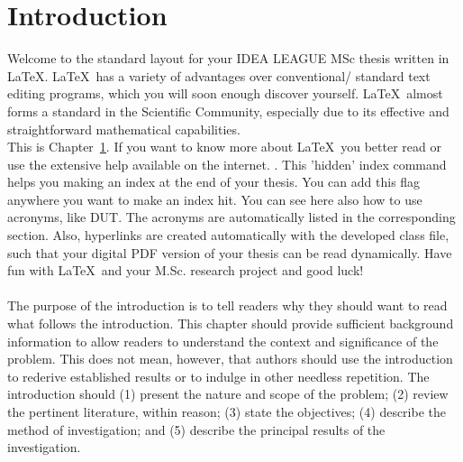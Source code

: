 \chapter{Introduction} \label{chap::intro}

    Welcome to the standard layout for your IDEA LEAGUE MSc thesis written in \LaTeX. \LaTeX\  has a variety of advantages over conventional/ standard text editing programs, which you will soon enough discover yourself. \LaTeX\  almost forms a standard in the Scientific Community, especially due to its effective and straightforward mathematical capabilities.\\
    This is Chapter\ \ref{chap::intro}. If you want to know more about \LaTeX\ you better read
    \cite{texbook} or use the extensive help available on the internet. . This 'hidden' index command helps you making an index at the end of your thesis. You can add this flag anywhere you want to make an index hit. You can see here also how to use acronyms, like \ac{DUT}. The acronyms are automatically listed in the corresponding section. Also, hyperlinks are created automatically with the developed class file, such that your digital PDF version of your thesis can be read dynamically.
 Have fun with \LaTeX\ and your M.Sc. research project and good luck! \\ \\
 
The purpose of the introduction is to tell readers why they should want to read what follows the introduction. This chapter should provide sufficient background information to allow readers to understand the context and significance of the problem. This does not mean, however, that authors should use the introduction to rederive established results or to indulge in other needless repetition. The introduction should (1) present the nature and scope of the problem; (2) review the pertinent literature, within reason; (3) state the objectives; (4) describe the method of investigation; and (5) describe the principal results of the investigation.